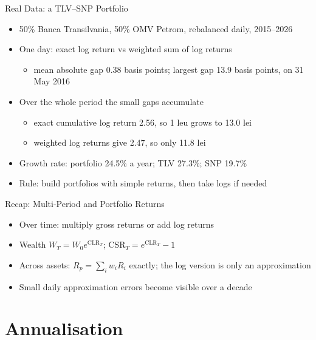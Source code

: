 \begin{frame}{Real Data: a TLV--SNP Portfolio}
\itemsize{\small}
\begin{itemize}
    \item 50\% Banca Transilvania, 50\% OMV Petrom, rebalanced daily, 2015--2026
    \item One day: exact log return vs weighted sum of log returns
    \begin{itemize}
        \item mean absolute gap 0.38 basis points; largest gap 13.9 basis points, on 31 May 2016
    \end{itemize}
    \item Over the whole period the small gaps accumulate
    \begin{itemize}
        \item exact cumulative log return 2.56, so 1 leu grows to 13.0 lei
        \item weighted log returns give 2.47, so only 11.8 lei
    \end{itemize}
    \item Growth rate: portfolio 24.5\% a year; TLV 27.3\%; SNP 19.7\%
    \item Rule: build portfolios with simple returns, then take logs if needed
\end{itemize}
\end{frame}

\begin{frame}{Recap: Multi-Period and Portfolio Returns}
\itemsize{\small}
\begin{itemize}
    \item Over time: multiply gross returns or add log returns
    \item Wealth $W_T = W_0 e^{\text{CLR}_T}$; $\text{CSR}_T = e^{\text{CLR}_T} - 1$
    \item Across assets: $R_p = \sum_i w_i R_i$ exactly; the log version is only an approximation
    \item Small daily approximation errors become visible over a decade
\end{itemize}
\end{frame}


\section{Annualisation}

